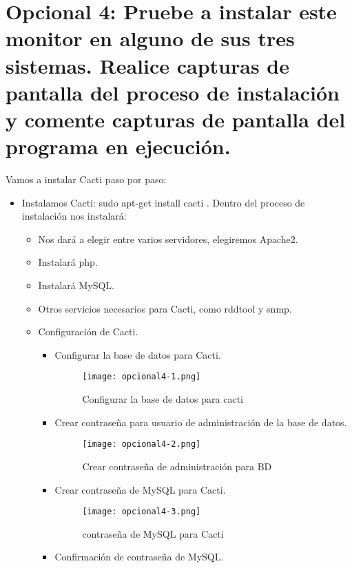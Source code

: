 	
	
	\section{Opcional 4: Pruebe a instalar este monitor en alguno de sus tres sistemas. Realice capturas de pantalla del proceso de instalación y comente capturas de pantalla del programa en ejecución.}
	
	Vamos a instalar Cacti\cite{opcional4-1} paso por paso:
	
	\begin{itemize}
		\item Instalamos Cacti: sudo apt-get install cacti . Dentro del proceso de instalación nos instalará:
		\begin{itemize}
			\item Nos dará a elegir entre varios servidores, elegiremos Apache2.
			\item Instalará php.
			\item Instalará MySQL.
			\item Otros servicios necesarios para Cacti, como rddtool y snmp.
			\item Configuración de Cacti.
			\begin{itemize}
				\item Configurar la base de datos para Cacti.
				\begin{figure}[H] 
					\centering
					\texttt{[image: opcional4-1.png]} 
					\label{figura2} 			
					\caption{Configurar la base de datos para cacti}
				\end{figure}
				\item Crear contraseña para usuario de administración de la base de datos.
				\begin{figure}[H] 
					\centering
					\texttt{[image: opcional4-2.png]} 
					\label{figura2} 			
					\caption{Crear contraseña de administración para BD}
				\end{figure}
				\item Crear contraseña de MySQL para Cacti.
				\begin{figure}[H] 
					\centering
					\texttt{[image: opcional4-3.png]} 
					\label{figura2} 			
					\caption{contraseña de MySQL para Cacti}
				\end{figure}
				\item Confirmación de contraseña de MySQL.

\end{itemize}
\end{itemize}
\end{itemize}
